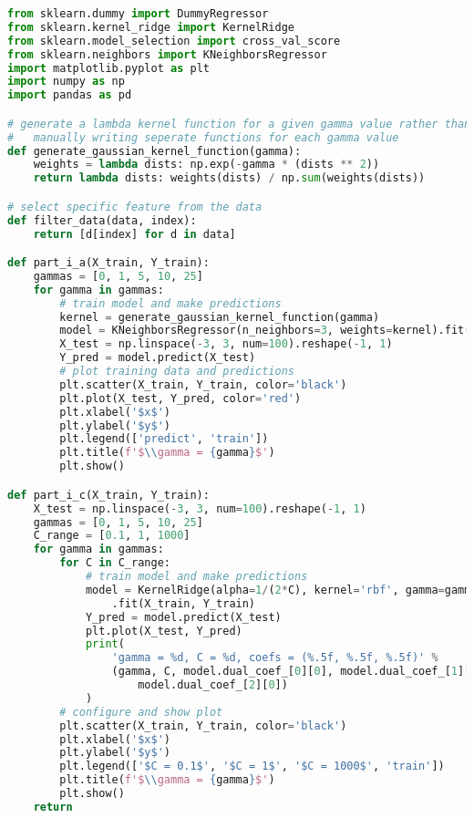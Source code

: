 \documentclass[12pt]{article}
\begin{document}
\lstset{basicstyle=\footnotesize}
\begin{lstlisting}[language=Python]
from sklearn.dummy import DummyRegressor
from sklearn.kernel_ridge import KernelRidge
from sklearn.model_selection import cross_val_score
from sklearn.neighbors import KNeighborsRegressor
import matplotlib.pyplot as plt
import numpy as np
import pandas as pd

# generate a lambda kernel function for a given gamma value rather than 
#   manually writing seperate functions for each gamma value
def generate_gaussian_kernel_function(gamma):
    weights = lambda dists: np.exp(-gamma * (dists ** 2))
    return lambda dists: weights(dists) / np.sum(weights(dists))

# select specific feature from the data
def filter_data(data, index):
    return [d[index] for d in data]

def part_i_a(X_train, Y_train):
    gammas = [0, 1, 5, 10, 25]
    for gamma in gammas:
        # train model and make predictions
        kernel = generate_gaussian_kernel_function(gamma)
        model = KNeighborsRegressor(n_neighbors=3, weights=kernel).fit(X_train, Y_train)
        X_test = np.linspace(-3, 3, num=100).reshape(-1, 1)
        Y_pred = model.predict(X_test)
        # plot training data and predictions
        plt.scatter(X_train, Y_train, color='black')
        plt.plot(X_test, Y_pred, color='red')
        plt.xlabel('$x$')
        plt.ylabel('$y$')
        plt.legend(['predict', 'train'])
        plt.title(f'$\\gamma = {gamma}$')
        plt.show()

def part_i_c(X_train, Y_train):
    X_test = np.linspace(-3, 3, num=100).reshape(-1, 1)
    gammas = [0, 1, 5, 10, 25]
    C_range = [0.1, 1, 1000]
    for gamma in gammas:
        for C in C_range:
            # train model and make predictions
            model = KernelRidge(alpha=1/(2*C), kernel='rbf', gamma=gamma)
                .fit(X_train, Y_train)
            Y_pred = model.predict(X_test)
            plt.plot(X_test, Y_pred)
            print(
                'gamma = %d, C = %d, coefs = (%.5f, %.5f, %.5f)' %
                (gamma, C, model.dual_coef_[0][0], model.dual_coef_[1][0],
                    model.dual_coef_[2][0])
            )
        # configure and show plot
        plt.scatter(X_train, Y_train, color='black')
        plt.xlabel('$x$')
        plt.ylabel('$y$')
        plt.legend(['$C = 0.1$', '$C = 1$', '$C = 1000$', 'train'])
        plt.title(f'$\\gamma = {gamma}$')
        plt.show()
    return


\end{lstlisting}
\end{document}
